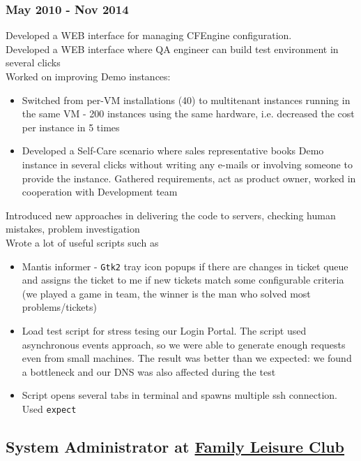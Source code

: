 \documentclass[letterpaper]{article}
\begin{document}
\subsubsection{May 2010 - Nov 2014}
\label{sec-2-4-1}
Developed a WEB interface for managing CFEngine configuration.\\
Developed a WEB interface where QA engineer can build test environment in several clicks\\
Worked on improving Demo instances:
\begin{itemize}
\item Switched from per-VM installations (40) to multitenant instances running in the same VM - 200 instances using the same hardware, i.e. decreased the cost per instance in 5 times
\item Developed a Self-Care scenario where sales representative books Demo instance in several clicks without writing any e-mails or involving someone to provide the instance. Gathered requirements, act as product owner, worked in cooperation with Development team
\end{itemize}
Introduced new approaches in delivering the code to servers, checking human mistakes, problem investigation\\
Wrote a lot of useful scripts such as
\begin{itemize}
\item Mantis informer - \verb~Gtk2~ tray icon popups if there are changes in ticket queue and assigns the ticket to me if new tickets match some configurable criteria (we played a game in team, the winner is the man who solved most problems/tickets)
\item Load test script for stress tesing our Login Portal. The script used asynchronous events approach, so we were able to generate enough requests even from small machines. The result was better than we expected: we found a bottleneck and our DNS was also affected during the test
\item Script opens several tabs in terminal and spawns multiple ssh connection. Used \verb~expect~
\end{itemize}
\subsection{System Administrator at \href{https://www.ksd.ua/en/}{Family Leisure Club}}
\label{sec-2-5}
\end{document}
